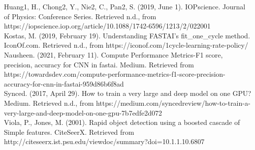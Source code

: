 \documentclass[letterpaper]{article} %
\begin{document}
Huang1, H., Chong2, Y., Nie2, C., Pan2, S. (2019, June 1). IOPscience. Journal of Physics: Conference Series. Retrieved n.d., from https://iopscience.iop.org/article/10.1088/1742-6596/1213/2/022001 
\\

Kostas, M. (2019, February 19). Understanding FASTAI's fit\_one\_cycle method. IconOf.com. Retrieved n.d., from https://iconof.com/1cycle-learning-rate-policy/ 
\\

Nausheen. (2021, February 11). Compute Performance Metrics-F1 score, precision, accuracy for CNN in fastai. Medium. Retrieved from https://towardsdev.com/compute-performance-metrics-f1-score-precision-accuracy-for-cnn-in-fastai-959d86b6f8ad 
\\

Synced. (2017, April 29). How to train a very large and deep model on one GPU? Medium. Retrieved n.d., from https://medium.com/syncedreview/how-to-train-a-very-large-and-deep-model-on-one-gpu-7b7edfe2d072 
\\

Viola, P., Jones, M. (2001). Rapid object detection using a boosted cascade of Simple features. CiteSeerX. Retrieved from http://citeseerx.ist.psu.edu/viewdoc/summary?doi=10.1.1.10.6807 
\\
\end{document}
